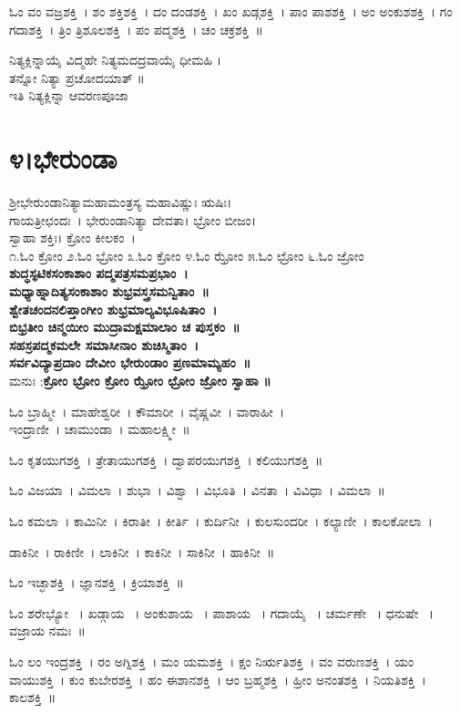 ಓಂ ವಂ ವಜ್ರಶಕ್ತಿ~।  ಶಂ ಶಕ್ತಿಶಕ್ತಿ~।  ದಂ ದಂಡಶಕ್ತಿ~।  ಖಂ ಖಡ್ಗಶಕ್ತಿ~।  ಪಾಂ ಪಾಶಶಕ್ತಿ~।  ಅಂ ಅಂಕುಶಶಕ್ತಿ~।  ಗಂ ಗದಾಶಕ್ತಿ~।  ತ್ರಿಂ ತ್ರಿಶೂಲಶಕ್ತಿ~।  ಪಂ ಪದ್ಮಶಕ್ತಿ~।  ಚಂ ಚಕ್ರಶಕ್ತಿ~॥ 

ನಿತ್ಯಕ್ಲಿನ್ನಾಯೈ ವಿದ್ಮಹೇ ನಿತ್ಯಮದದ್ರವಾಯೈ ಧೀಮಹಿ ।\\ತನ್ನೋ ನಿತ್ಯಾ ಪ್ರಚೋದಯಾತ್ ॥\\
ಇತಿ ನಿತ್ಯಕ್ಲಿನ್ನಾ ಆವರಣಪೂಜಾ
\section{೪।ಭೇರುಂಡಾ}
ಶ್ರೀಭೇರುಂಡಾನಿತ್ಯಾಮಹಾಮಂತ್ರಸ್ಯ ಮಹಾವಿಷ್ಣುಃ ಋಷಿಃ। \\ಗಾಯತ್ರೀಛಂದಃ~। ಭೇರುಂಡಾನಿತ್ಯಾ ದೇವತಾ। ಭ್ರೋಂ ಬೀಜಂ।\\ ಸ್ವಾಹಾ ಶಕ್ತಿಃ। ಕ್ರೋಂ ಕೀಲಕಂ~।\\
೧.ಓಂ ಕ್ರೋಂ  ೨.ಓಂ ಭ್ರೋಂ ೩.ಓಂ ಕ್ರೋಂ  ೪.ಓಂ ಝ್ರೋಂ ೫.ಓಂ ಛ್ರೋಂ  ೬.ಓಂ ಜ್ರೋಂ \\
{\bfseries ಶುದ್ಧಸ್ಫಟಿಕಸಂಕಾಶಾಂ ಪದ್ಮಪತ್ರಸಮಪ್ರಭಾಂ~।\\
ಮಧ್ಯಾಹ್ನಾದಿತ್ಯಸಂಕಾಶಾಂ ಶುಭ್ರವಸ್ತ್ರಸಮನ್ವಿತಾಂ~॥\\
ಶ್ವೇತಚಂದನಲಿಪ್ತಾಂಗೀಂ ಶುಭ್ರಮಾಲ್ಯವಿಭೂಷಿತಾಂ~।\\	
ಬಿಭ್ರತೀಂ ಚಿನ್ಮಯೀಂ ಮುದ್ರಾಮಕ್ಷಮಾಲಾಂ ಚ ಪುಸ್ತಕಂ~॥\\
ಸಹಸ್ರಪದ್ಮಕಮಲೇ ಸಮಾಸೀನಾಂ ಶುಚಿಸ್ಮಿತಾಂ~।\\
ಸರ್ವವಿದ್ಯಾಪ್ರದಾಂ ದೇವೀಂ ಭೇರುಂಡಾಂ ಪ್ರಣಮಾಮ್ಯಹಂ~॥\\}
ಮನುಃ :{\bfseries  ಕ್ರೋಂ ಭ್ರೋಂ ಕ್ರೋಂ ಝ್ರೋಂ ಛ್ರೋಂ ಜ್ರೋಂ ಸ್ವಾಹಾ ॥}

ಓಂ ಬ್ರಾಹ್ಮೀ~।  ಮಾಹೇಶ್ವರೀ~।  ಕೌಮಾರೀ~।  ವೈಷ್ಣವೀ~। ವಾರಾಹೀ~।\\  ಇಂದ್ರಾಣೀ~।  ಚಾಮುಂಡಾ~।  ಮಹಾಲಕ್ಷ್ಮೀ~॥ 

ಓಂ ಕೃತಯುಗಶಕ್ತಿ~।  ತ್ರೇತಾಯುಗಶಕ್ತಿ~।  ದ್ವಾಪರಯುಗಶಕ್ತಿ~।  ಕಲಿಯುಗಶಕ್ತಿ~॥ 

ಓಂ ವಿಜಯಾ~।  ವಿಮಲಾ~।  ಶುಭಾ~।  ವಿಶ್ವಾ~।  ವಿಭೂತಿ~।  ವಿನತಾ~।  ವಿವಿಧಾ~।  ವಿಮಲಾ~॥ 

ಓಂ ಕಮಲಾ~।  ಕಾಮಿನೀ~।  ಕಿರಾತೀ~।  ಕೀರ್ತಿ~।  ಕುರ್ದಿನೀ~।  ಕುಲಸುಂದರೀ~।  ಕಲ್ಯಾಣೀ~।  ಕಾಲಕೋಲಾ~।  

ಡಾಕಿನೀ~।  ರಾಕಿಣೀ~।  ಲಾಕಿನೀ~।  ಕಾಕಿನೀ~।  ಸಾಕಿನೀ~।  ಹಾಕಿನೀ~॥ 

ಓಂ ಇಚ್ಛಾಶಕ್ತಿ~।  ಜ್ಞಾನಶಕ್ತಿ~।  ಕ್ರಿಯಾಶಕ್ತಿ~॥ 

ಓಂ ಶರೇಭ್ಯೋ ~।  ಖಡ್ಗಾಯ ~।  ಅಂಕುಶಾಯ ~। ಪಾಶಾಯ ~।  ಗದಾಯೈ ~। ಚರ್ಮಣೇ ~।  ಧನುಷೇ ~।  ವಜ್ರಾಯ  ನಮಃ~॥

ಓಂ ಲಂ ಇಂದ್ರಶಕ್ತಿ~।  ರಂ ಅಗ್ನಿಶಕ್ತಿ~।  ಮಂ ಯಮಶಕ್ತಿ~।  ಕ್ಷಂ ನಿರ್ಋತಿಶಕ್ತಿ~।  ವಂ ವರುಣಶಕ್ತಿ~।  ಯಂ ವಾಯುಶಕ್ತಿ~।  ಕುಂ ಕುಬೇರಶಕ್ತಿ~।  ಹಂ ಈಶಾನಶಕ್ತಿ~।  ಆಂ ಬ್ರಹ್ಮಶಕ್ತಿ~।  ಹ್ರೀಂ ಅನಂತಶಕ್ತಿ~।  ನಿಯತಿಶಕ್ತಿ~।  ಕಾಲಶಕ್ತಿ~॥ 

